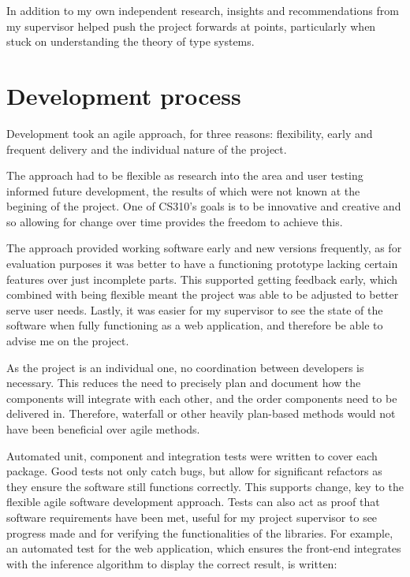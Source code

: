 \documentclass[a4paper,fleqn,oneside,12pt]{report}
\begin{document}
In addition to my own independent research, insights and recommendations from my supervisor helped push the project forwards at points, particularly when stuck on understanding the theory of type systems.

\section{Development process}\label{id:h.3r2hzi490wg9}

Development took an agile approach, for three reasons: flexibility, early and frequent delivery and the individual nature of the project.

The approach had to be flexible as research into the area and user testing informed future development, the results of which were not known at the begining of the project. One of CS310's goals is to be innovative and creative and so allowing for change over time provides the freedom to achieve this.

The approach provided working software early and new versions frequently, as for evaluation purposes it was better to have a functioning prototype lacking certain features over just incomplete parts. This supported getting feedback early, which combined with being flexible meant the project was able to be adjusted to better serve user needs. Lastly, it was easier for my supervisor to see the state of the software when fully functioning as a web application, and therefore be able to advise me on the project.

As the project is an individual one, no coordination between developers is necessary. This reduces the need to precisely plan and document how the components will integrate with each other, and the order components need to be delivered in. Therefore, waterfall or other heavily plan-based methods would not have been beneficial over agile methods.

Automated unit, component and integration tests were written to cover each package. Good tests not only catch bugs, but allow for significant refactors as they ensure the software still functions correctly. This supports change, key to the flexible agile software development approach. Tests can also act as proof that software requirements have been met, useful for my project supervisor to see progress made and for verifying the functionalities of the libraries. For example, an automated test for the web application, which ensures the front-end integrates with the inference algorithm to display the correct result, is written:
\end{document}
